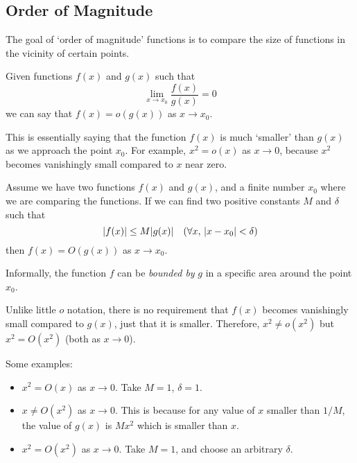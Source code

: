 \subsection{Order of Magnitude}
The goal of `order of magnitude' functions is to compare the size of functions in the vicinity of certain points.
\begin{definition}[Little \(o\)]
	Given functions \(f(x)\) and \(g(x)\) such that
	\begin{equation}
		\lim\limits_{x \to x_0} \frac{f(x)}{g(x)} = 0
	\end{equation}
	we can say that \(f(x) = o(g(x))\) as \(x \to x_0\).
\end{definition}

This is essentially saying that the function \(f(x)\) is much `smaller' than \(g(x)\) as we approach the point \(x_0\).
For example, \(x^2 = o(x)\) as \(x \to 0\), because \(x^2\) becomes vanishingly small compared to \(x\) near zero.

\begin{definition}
	Assume we have two functions \(f(x)\) and \(g(x)\), and a finite number \(x_0\) where we are comparing the functions.
	If we can find two positive constants \(M\) and \(\delta\) such that
	\begin{equation}
		\abs{f(x)} \leq M\abs{g(x)} \quad(\forall x,\, \abs{x-x_0} < \delta)
	\end{equation}
	then \(f(x) = O(g(x))\) as \(x \to x_0\).
\end{definition}
Informally, the function \(f\) can be \textit{bounded by} \(g\) in a specific area around the point \(x_0\).

Unlike little \(o\) notation, there is no requirement that \(f(x)\) becomes vanishingly small compared to \(g(x)\), just that it is smaller.
Therefore, \(x^2 \neq o(x^2)\) but \(x^2 = O(x^2)\) (both as \(x \to 0\)).

Some examples:
\begin{itemize}
	\item \(x^2 = O(x)\) as \(x \to 0\).
	      Take \(M = 1\), \(\delta = 1\).
	\item \(x \neq O(x^2)\) as \(x \to 0\).
	      This is because for any value of \(x\) smaller than \(1/M\), the value of \(g(x)\) is \(Mx^2\) which is smaller than \(x\).
	\item \(x^2 = O(x^2)\) as \(x \to 0\).
	      Take \(M = 1\), and choose an arbitrary \(\delta\).
\end{itemize}

